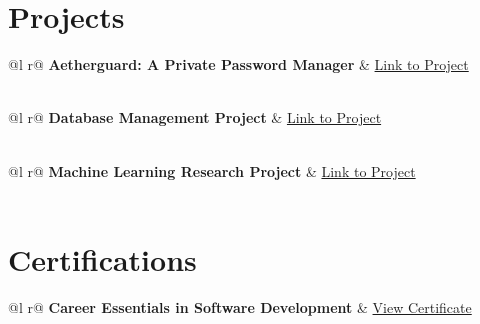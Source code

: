 \documentclass[a4paper,12pt]{article}
\begin{document}
  
\section{Projects}

\begin{tabularx}{\linewidth}{ @{}l r@{} }
\textbf{Aetherguard: A Private Password Manager} & \hfill \href{https://github.com/thisisarnabdas/AetherGuard}{Link to Project} \\[3.75pt]
  \\
\end{tabularx}

\begin{tabularx}{\linewidth}{ @{}l r@{} }
\textbf{Database Management Project} & \hfill \href{https://github.com/thisisarnabdas/DSE}{Link to Project} \\[3.75pt]
  \\
\end{tabularx}

\begin{tabularx}{\linewidth}{ @{}l r@{} }
\textbf{Machine Learning Research Project} & \hfill \href{https://github.com/thisisarnabdas/CSE422_Project-Air-Quality-Prediction-}{Link to Project} \\[3.75pt]
  \\
\end{tabularx}


\section{Certifications}

\begin{tabularx}{\linewidth}{ @{}l r@{} }
\textbf{Career Essentials in Software Development} & \hfill \href{https://www.linkedin.com/learning/certificates/b47ab2e721fb8ba120d27288096edeca25ef7cfba7b85efdbd84445d1ec05b55}{View Certificate} \\[3.75pt]
 \\
\end{tabularx}
\end{document}
